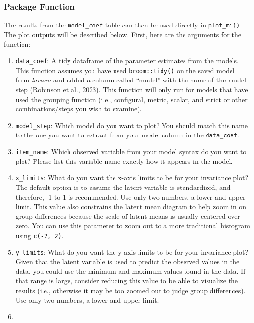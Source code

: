 \documentclass[
  man]{apa7}
\providecommand{\tightlist}{%
  \setlength{\itemsep}{0pt}\setlength{\parskip}{0pt}}
\begin{document}
\hypertarget{package-function}{%
\subsubsection{Package Function}\label{package-function}}

The results from the \texttt{model\_coef} table can then be used directly in \texttt{plot\_mi()}. The plot outputs will be described below. First, here are the arguments for the function:

\begin{enumerate}
\def\labelenumi{\arabic{enumi})}
\tightlist
\item
  \texttt{data\_coef}: A tidy dataframe of the parameter estimates from the models. This function assumes you have used \texttt{broom::tidy()} on the saved model from \emph{lavaan} and added a column called ``model'' with the name of the model step (Robinson et al., 2023). This function will only run for models that have used the grouping function (i.e., configural, metric, scalar, and strict or other combinations/steps you wish to examine).
\item
  \texttt{model\_step}: Which model do you want to plot? You should match this name to the one you want to extract from your model column in the \texttt{data\_coef}.
\item
  \texttt{item\_name}: Which observed variable from your model syntax do you want to plot? Please list this variable name exactly how it appears in the model.
\item
  \texttt{x\_limits}: What do you want the x-axis limits to be for your invariance plot? The default option is to assume the latent variable is standardized, and therefore, -1 to 1 is recommended. Use only two numbers, a lower and upper limit. This value also constrains the latent mean diagram to help zoom in on group differences because the scale of latent means is usually centered over zero. You can use this parameter to zoom out to a more traditional histogram using \texttt{c(-2,\ 2)}.
\item
  \texttt{y\_limits}: What do you want the y-axis limits to be for your invariance plot? Given that the latent variable is used to predict the observed values in the data, you could use the minimum and maximum values found in the data. If that range is large, consider reducing this value to be able to visualize the results (i.e., otherwise it may be too zoomed out to judge group differences). Use only two numbers, a lower and upper limit.
\item

\end{enumerate}
\end{document}
